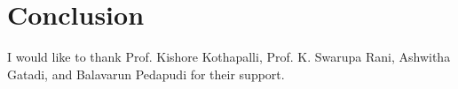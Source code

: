 \documentclass[sigconf,nonacm]{acmart}
\begin{document}
\section{Conclusion}
\label{sec:conclusion}


\begin{acks}
I would like to thank Prof. Kishore Kothapalli, Prof. K. Swarupa Rani, Ashwitha Gatadi, and Balavarun Pedapudi for their support.
\end{acks}




\clearpage
\appendix

\end{document}
